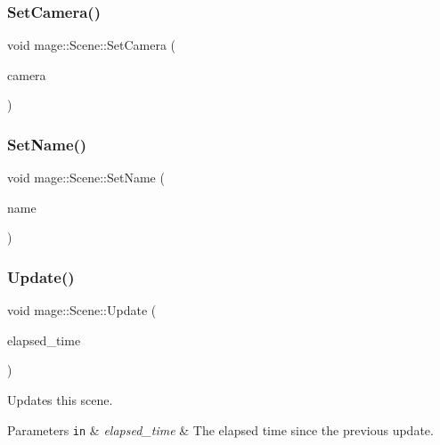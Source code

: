\hypertarget{classmage_1_1_scene_a57718151e0102306b3abb22da45ae27a}{}\label{classmage_1_1_scene_a57718151e0102306b3abb22da45ae27a} 
\subsubsection{\texorpdfstring{Set\+Camera()}{SetCamera()}}
{\footnotesize\ttfamily void mage\+::\+Scene\+::\+Set\+Camera (\begin{DoxyParamCaption}\item[{\hyperlink{namespacemage_a1e01ae66713838a7a67d30e44c67703e}{Shared\+Ptr}$<$ \hyperlink{classmage_1_1_camera}{Camera} $>$}]{camera }\end{DoxyParamCaption})}

\hypertarget{classmage_1_1_scene_a9b7c1c2f84cc3b3c5ff3de4f29d830e9}{}\label{classmage_1_1_scene_a9b7c1c2f84cc3b3c5ff3de4f29d830e9} 
\subsubsection{\texorpdfstring{Set\+Name()}{SetName()}}
{\footnotesize\ttfamily void mage\+::\+Scene\+::\+Set\+Name (\begin{DoxyParamCaption}\item[{const string \&}]{name }\end{DoxyParamCaption})}

\hypertarget{classmage_1_1_scene_a8751628bf9ed4f15993ca4e8e2ffc966}{}\label{classmage_1_1_scene_a8751628bf9ed4f15993ca4e8e2ffc966} 
\subsubsection{\texorpdfstring{Update()}{Update()}}
{\footnotesize\ttfamily void mage\+::\+Scene\+::\+Update (\begin{DoxyParamCaption}\item[{double}]{elapsed\+\_\+time }\end{DoxyParamCaption})}

Updates this scene.


\begin{DoxyParams}[1]{Parameters}
\mbox{\tt in}  & {\em elapsed\+\_\+time} & The elapsed time since the previous update. \\
\hline
\end{DoxyParams}


